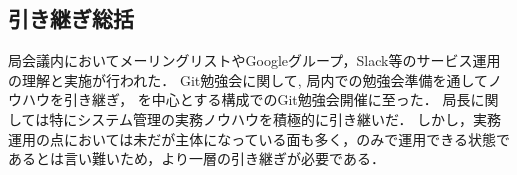 \subsection*{引き継ぎ総括}


局会議内においてメーリングリストやGoogleグループ，Slack等のサービス運用の理解と実施が行われた．
Git勉強会に関して, 局内での勉強会準備を通してノウハウを引き継ぎ， \secondGrade{}を中心とする構成でのGit勉強会開催に至った．
局長に関しては特にシステム管理の実務ノウハウを積極的に引き継いだ．
しかし，実務運用の点においては未だ\fourthGrade{}が主体になっている面も多く，\secondGrade{}のみで運用できる状態であるとは言い難いため，より一層の引き継ぎが必要である．
